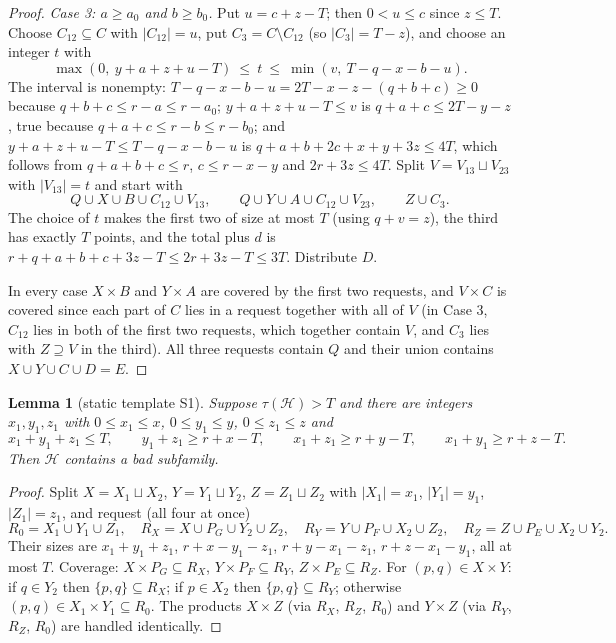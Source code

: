 \documentclass[11pt]{amsart}
\newtheorem{lemma}[theorem]{Lemma}
\theoremstyle{definition}
\theoremstyle{remark}
\newcommand{\cH}{\mathcal H}
\begin{document}
\begin{proof}
\emph{Case 3: $a\ge a_0$ and $b\ge b_0$.} Put $u=c+z-T$; then $0<u\le c$ since $z\le T$. Choose $C_{12}\subseteq C$ with $|C_{12}|=u$, put $C_3=C\setminus C_{12}$ (so $|C_3|=T-z$), and choose an integer $t$ with
\[
\max(0,\ y+a+z+u-T)\ \le\ t\ \le\ \min(v,\ T-q-x-b-u).
\]
The interval is nonempty: $T-q-x-b-u=2T-x-z-(q+b+c)\ge0$ because $q+b+c\le r-a\le r-a_0$; $y+a+z+u-T\le v$ is $q+a+c\le 2T-y-z$, true because $q+a+c\le r-b\le r-b_0$; and $y+a+z+u-T\le T-q-x-b-u$ is $q+a+b+2c+x+y+3z\le4T$, which follows from $q+a+b+c\le r$, $c\le r-x-y$ and $2r+3z\le4T$. Split $V=V_{13}\sqcup V_{23}$ with $|V_{13}|=t$ and start with
\[
Q\cup X\cup B\cup C_{12}\cup V_{13},\qquad Q\cup Y\cup A\cup C_{12}\cup V_{23},\qquad Z\cup C_3 .
\]
The choice of $t$ makes the first two of size at most $T$ (using $q+v=z$), the third has exactly $T$ points, and the total plus $d$ is $r+q+a+b+c+3z-T\le 2r+3z-T\le 3T$. Distribute $D$.

In every case $X\times B$ and $Y\times A$ are covered by the first two requests, and $V\times C$ is covered since each part of $C$ lies in a request together with all of $V$ (in Case 3, $C_{12}$ lies in both of the first two requests, which together contain $V$, and $C_3$ lies with $Z\supseteq V$ in the third). All three requests contain $Q$ and their union contains $X\cup Y\cup C\cup D=E$.
\end{proof}

\begin{lemma}[static template S1]\label{lem:S1}
Suppose $\tau(\cH)>T$ and there are integers $x_1,y_1,z_1$ with $0\le x_1\le x$, $0\le y_1\le y$, $0\le z_1\le z$ and
\[
x_1+y_1+z_1\le T,\qquad y_1+z_1\ge r+x-T,\qquad x_1+z_1\ge r+y-T,\qquad x_1+y_1\ge r+z-T.
\]
Then $\cH$ contains a bad subfamily.
\end{lemma}
\begin{proof}
Split $X=X_1\sqcup X_2$, $Y=Y_1\sqcup Y_2$, $Z=Z_1\sqcup Z_2$ with $|X_1|=x_1$, $|Y_1|=y_1$, $|Z_1|=z_1$, and request (all four at once)
\[
R_0=X_1\cup Y_1\cup Z_1,\quad R_X=X\cup P_G\cup Y_2\cup Z_2,\quad R_Y=Y\cup P_F\cup X_2\cup Z_2,\quad R_Z=Z\cup P_E\cup X_2\cup Y_2 .
\]
Their sizes are $x_1+y_1+z_1$, $r+x-y_1-z_1$, $r+y-x_1-z_1$, $r+z-x_1-y_1$, all at most $T$. Coverage: $X\times P_G\subseteq R_X$, $Y\times P_F\subseteq R_Y$, $Z\times P_E\subseteq R_Z$. For $(p,q)\in X\times Y$: if $q\in Y_2$ then $\{p,q\}\subseteq R_X$; if $p\in X_2$ then $\{p,q\}\subseteq R_Y$; otherwise $(p,q)\in X_1\times Y_1\subseteq R_0$. The products $X\times Z$ (via $R_X$, $R_Z$, $R_0$) and $Y\times Z$ (via $R_Y$, $R_Z$, $R_0$) are handled identically.
\end{proof}
\end{document}
